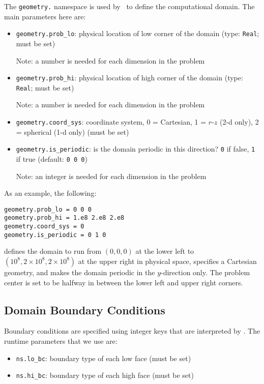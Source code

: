 The {\tt geometry.} namespace is used by \amrex\ to define the
computational domain.  The main parameters here are:
\begin{itemize}
\item {\tt geometry.prob\_lo}: physical location of low corner of the
domain (type: {\tt Real}; must be set)

  Note: a number is needed for each dimension in the problem
  
\item {\tt geometry.prob\_hi}: physical location of high corner of the
domain (type: {\tt Real}; must be set)

  Note: a number is needed for each dimension in the problem
  
\item {\tt geometry.coord\_sys}: coordinate system, 0 = Cartesian,
1 = $r$-$z$ (2-d only), 2 = spherical (1-d only) (must be set)

\item {\tt geometry.is\_periodic}: is the domain periodic in this direction?
  {\tt 0} if false, {\tt 1} if true  (default: {\tt 0 0 0}) 

  Note: an integer is needed for each dimension in the problem

\end{itemize}

As an example, the following:
\begin{lstlisting}
geometry.prob_lo = 0 0 0
geometry.prob_hi = 1.e8 2.e8 2.e8 
geometry.coord_sys = 0 
geometry.is_periodic = 0 1 0 
\end{lstlisting}
defines the domain to run from $(0,0,0)$ at the lower left to
$(10^8,2\times 10^8,2\times 10^8)$ at the upper right in physical space, specifies a
Cartesian geometry, and makes the domain periodic in the $y$-direction
only. The problem center is set to be halfway in between the lower left and 
upper right corners.


\subsection{Domain Boundary Conditions}

Boundary conditions are specified using integer keys that are interpreted
by \amrex.  The runtime parameters that we use are:
\begin{itemize}
\item {\tt ns.lo\_bc}: boundary type of each low face  (must be set)
\item {\tt ns.hi\_bc}: boundary type of each high face (must be set)
\end{itemize}

